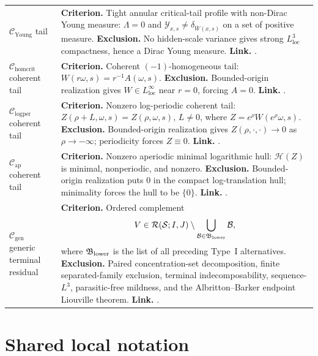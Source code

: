 \documentclass[11pt]{amsart}
\numberwithin{equation}{section}
\theoremstyle{plain}
\theoremstyle{definition}
\theoremstyle{remark}
\newcommand{\loc}{\mathrm{loc}}
\newcommand{\calS}{\mathcal S}
\newcommand{\calR}{\mathcal R}
\newcommand{\Cgen}{\mathcal C_{\mathrm{gen}}}
\newcommand{\Chomcrit}{\mathcal C_{\mathrm{homcrit}}}
\newcommand{\Clogper}{\mathcal C_{\mathrm{logper}}}
\newcommand{\Capcrit}{\mathcal C_{\mathrm{ap}}}
\newcommand{\Cyoung}{\mathcal C_{\mathrm{Young}}}
\begin{document}
\begin{longtable}{@{}L{1.20in}L{4.65in}@{}}
\(\Cyoung\) tail &
\textbf{Criterion.}  Tight annular critical-tail profile with non-Dirac Young
measure: \(\Lambda=0\) and
\(\mathcal Y_{x,s}\ne\delta_{\bar W(x,s)}\) on a set of positive measure.
\textbf{Exclusion.}  No hidden-scale variance gives strong
\(L^3_{\loc}\) compactness, hence a Dirac Young measure.
\textbf{Link.}  .\\

\(\Chomcrit\) coherent tail &
\textbf{Criterion.}  Coherent \((-1)\)-homogeneous tail:
\(W(r\omega,s)=r^{-1}A(\omega,s)\).
\textbf{Exclusion.}  Bounded-origin realization gives
\(W\in L^\infty_{\loc}\) near \(r=0\), forcing \(A=0\).
\textbf{Link.}  .\\

\(\Clogper\) coherent tail &
\textbf{Criterion.}  Nonzero log-periodic coherent tail:
\(Z(\rho+L,\omega,s)=Z(\rho,\omega,s)\), \(L\ne0\), where
\(Z=e^\rho W(e^\rho\omega,s)\).
\textbf{Exclusion.}  Bounded-origin realization gives
\(Z(\rho,\cdot,\cdot)\to0\) as \(\rho\to-\infty\); periodicity forces
\(Z\equiv0\).
\textbf{Link.}  .\\

\(\Capcrit\) coherent tail &
\textbf{Criterion.}  Nonzero aperiodic minimal logarithmic hull:
\(\mathcal H(Z)\) is minimal, nonperiodic, and nonzero.
\textbf{Exclusion.}  Bounded-origin realization puts \(0\) in the compact
log-translation hull; minimality forces the hull to be \(\{0\}\).
\textbf{Link.}  .\\

\(\Cgen\) generic terminal residual &
\textbf{Criterion.}  Ordered complement
\[
   V\in\calR(\calS;I,J)
   \setminus\bigcup_{\mathcal B\in\mathfrak B_{\rm lower}}\mathcal B ,
\]
where \(\mathfrak B_{\rm lower}\) is the list of all preceding Type~I
alternatives.
\textbf{Exclusion.}  Paired concentration-set decomposition, finite
separated-family exclusion, terminal indecomposability, sequence-\(L^3\),
parasitic-free mildness, and the Albritton--Barker endpoint Liouville theorem.
\textbf{Link.}
.\\
\end{longtable}
\endgroup

\section{Shared local notation}
\label{sec:shared-notation}
\end{document}
